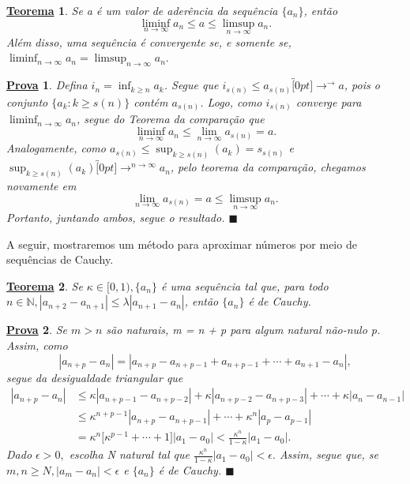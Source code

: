 \documentclass{article}
\newtheorem*{theorem*}{\underline{Teorema}}
\newtheorem*{proof*}{\underline{Prova}}
\renewcommand\qedsymbol{$\blacksquare$}
\begin{document}
 \begin{theorem*}
   Se a \'e um valor de ader\^encia da sequ\^encia $\{a_{n}\} $, ent\~ao
   $$
     \liminf_{n\to\infty}a_{n}\leq{a}\leq{\limsup_{n\to\infty}a_{n}}.
   $$
   Al\'em disso, uma sequ\^encia \'e convergente se, e somente se, $\liminf_{n\to\infty}a_{n} = \limsup_{n\to\infty}a_{n}.$
 \end{theorem*}
\begin{proof*}
  Defina $i_{n} = \inf_{k\geq{n}}a_{k}$. Segue que $i_{s(n)}\leq{a_{s(n)}}\overbracket[0pt]{\longrightarrow}^{\to }a$, pois o conjunto
  $\{a_{k}: k\geq{s(n)}\}$ cont\'em $a_{s(n)}$. Logo, como $i_{s(n)}$ converge para $\liminf_{n\to\infty}a_{n}$, segue do Teorema da compara\c c\~ao que 
    $$
      \liminf_{n\to\infty}a_{n} \leq{\lim_{n\to\infty}a_{s(n)} = a}.
    $$
    Analogamente, como $a_{s(n)}\leq{\sup_{k\geq{s(n)}}{(a_{k})}} = s_{s(n)}$ e $\sup_{k\geq{s(n)}}{(a_{k})}\overbracket[0pt]{\longrightarrow}^{n\to\infty}a_{n}$, 
  pelo teorema da compara\c c\~ao, chegamos novamente em 
    $$
      \lim_{n\to\infty}a_{s(n)} = a \leq{\limsup_{n\to\infty}a_{n}}.
    $$
    Portanto, juntando ambos, segue o resultado. \qedsymbol
\end{proof*}
  A seguir, mostraremos um m\'etodo para aproximar n\'umeros por meio de sequ\^encias de Cauchy.
\begin{theorem*}
  Se $\kappa\in{[0, 1)},\{a_{n}\} $ \'e uma sequ\^encia tal que, para todo $n\in \mathbb{N}, |a_{n+2}-a_{n+1}|\leq{\lambda|a_{n+1}-a_{n}|}$, 
  ent\~ao $\{a_{n}\} $ \'e de Cauchy.
\end{theorem*}
\begin{proof*}
  Se $m > n$ s\~ao naturais, m = n + p para algum natural n\~ao-nulo p. Assim, como 
    $$
      |a_{n+p} - a_{n}| = |a_{n+p} - a_{n+p-1} + a_{n+p-1}+\cdots + a_{n+1} - a_{n}|,
    $$
  segue da desigualdade triangular que
 \begin{align*}
   |a_{n+p}-a_{n}| &\leq{\kappa|a_{n+p-1}-a_{n+p-2}|+\kappa|a_{n+p-2}-a_{n+p-3}|+\cdots+\kappa|a_{n}-a_{n-1}|}\\ 
                   &\leq{\kappa^{n+p-1}|a_{n+p} - a_{n+p-1}|}+\cdots+{\kappa^{n}|a_{p}-a_{p-1}|}\\
                   &={\kappa^{n}\biggl[\kappa^{p-1}+\cdots+1\biggr]}|a_{1}-a_{0}| < \frac{\kappa^{n}}{1-\kappa}|a_{1}-a_{0}|.
 \end{align*}
 Dado $\epsilon > 0,$ escolha N natural tal que $\displaystyle \frac{\kappa^{n}}{1-\kappa}|a_{1}-a_{0}| < \epsilon.$ Assim, segue que,
 se $m, n\geq{N}, |a_{m}-a_{n}|<\epsilon$ e $\{a_{n}\} $ \'e de Cauchy. \qedsymbol
\end{proof*}
\end{document}
